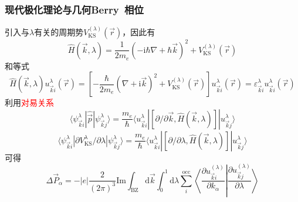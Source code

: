 \frame
{
	\frametitle{现代极化理论与几何\textrm{Berry~}相位}
		引入与$\lambda$有关的周期势$V_{\mathrm{KS}}^{(\lambda)}(\vec r)$，因此有
	\begin{displaymath}
		\hat H(\vec k,\lambda)=\frac1{2m_e}\left( -\mathrm{i}\hbar\nabla+\hbar\vec k \right)^2+V_{\mathrm{KS}}^{(\lambda)}(\vec r)
	\end{displaymath}
	和等式
	\begin{displaymath}
		\hat H(\vec k,\lambda)u_{\vec k i}^{\lambda}(\vec r)=\left[ -\frac{\hbar}{2m_e}(\nabla+\mathrm{i}\vec k)^2 +V_{\mathrm{KS}}^{(\lambda)}(\vec r)\right]u_{\vec k i}^{\lambda}(\vec r)=\varepsilon_{\vec k i}^{\lambda}u_{\vec k i}^{\lambda}(\vec r)
	\end{displaymath}
	利用\textcolor{red}{对易关系}
	\begin{displaymath}
		\langle\psi_{\vec k i}^{\lambda}|\hat{\vec p}|\psi_{\vec k j}^{\lambda}\rangle=\frac{m_e}{\hbar}\langle u_{\vec k i}^{\lambda}|[\partial/\partial\vec k,\hat H(\vec k,\lambda)]|u_{\vec k j}^{\lambda}\rangle
	\end{displaymath}
	\begin{displaymath}
		\langle\psi_{\vec k i}^{\lambda}|\partial V_{\mathrm{KS}}^{\lambda}/\partial\lambda|\psi_{\vec k j}^{\lambda}\rangle=\frac{m_e}{\hbar}\langle u_{\vec k i}^{\lambda}|[\partial/\partial\lambda,\hat H(\vec k,\lambda)]|u_{\vec k j}^{\lambda}\rangle
	\end{displaymath}
	可得
	\begin{displaymath}
		\Delta\vec P_{\alpha}=-|e|\frac2{(2\pi)^3}\mathrm{Im}\int_{\mathrm{BZ}}\mathrm{d}\vec k\int_0^1\mathrm{d}\lambda\sum_i^{\mathrm{occ}}\left\langle\frac{\partial u_{\vec k i}^{(\lambda)}}{\partial k_{\alpha}}\right|\left.\frac{\partial u_{\vec k j}^{(\lambda)}}{\partial\lambda}\right\rangle
	\end{displaymath}
}

